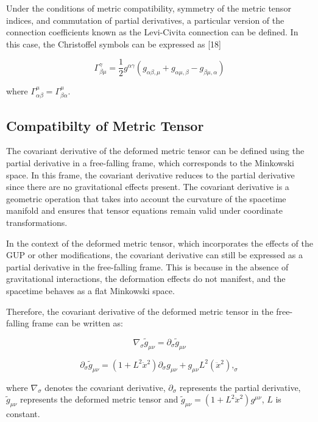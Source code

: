 \documentclass{article}
\begin{document}
Under the conditions of metric compatibility, symmetry of the metric tensor indices, and commutation of partial derivatives, a particular version of the connection coefficients known as the Levi-Civita connection can be defined. In this case, the Christoffel symbols can be expressed as [18]

\begin{equation}
\Gamma^{\gamma}_{\beta\mu} = \frac{1}{2} g^{\alpha\gamma}(g_{\alpha\beta,\mu} + g_{\alpha\mu,\beta} - g_{\beta\mu,\alpha})
\label{eq:5}
\end{equation}

where $\Gamma^{\mu}_{\alpha\beta} = \Gamma^{\mu}_{\beta\alpha}$.


\subsection{\Large Compatibilty of Metric Tensor}


The covariant derivative of the deformed metric tensor can be defined using the partial derivative in a free-falling frame, which corresponds to the Minkowski space. In this frame, the covariant derivative reduces to the partial derivative since there are no gravitational effects present. The covariant derivative is a geometric operation that takes into account the curvature of the spacetime manifold and ensures that tensor equations remain valid under coordinate transformations.

In the context of the deformed metric tensor, which incorporates the effects of the GUP or other modifications, the covariant derivative can still be expressed as a partial derivative in the free-falling frame. This is because in the absence of gravitational interactions, the deformation effects do not manifest, and the spacetime behaves as a flat Minkowski space.

Therefore, the covariant derivative of the deformed metric tensor in the free-falling frame can be written as:

\begin{equation}
    \nabla_\sigma \tilde{g}_{\mu\nu} = \partial_\sigma \tilde{g}_{\mu\nu}
\label{37}
\end{equation}

\begin{equation}
    \partial_\sigma \tilde{g}_{\mu\nu} = (1 + L^2 \ddot x^2)\partial_\sigma g_{\mu\nu} + g_{\mu\nu}L^2(\ddot x^2),_\sigma
\label{38}
\end{equation}


where $\nabla_\sigma$ denotes the covariant derivative, $ \partial_\sigma$ represents the partial derivative,  $\tilde{g}_{\mu\nu}$ represents the deformed metric tensor and $\tilde{g}_{\mu\nu}=(1 + L^2\ddot x^2)g^{\mu\nu}$, $L$ is constant.
\end{document}
